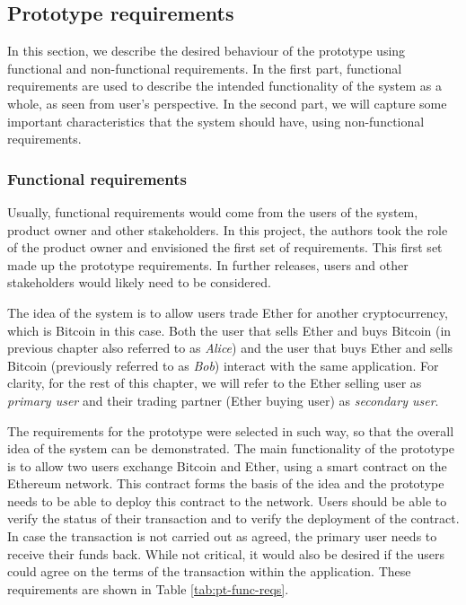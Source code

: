\subsection{Prototype requirements}

In this section, we describe the desired behaviour of the prototype using functional and non-functional requirements. In the first part, functional requirements are used to describe the intended functionality of the system as a whole, as seen from user's perspective. In the second part, we will capture some important characteristics that the system should have, using non-functional requirements.

\subsubsection{Functional requirements}
Usually, functional requirements would come from the users of the system, product owner and other stakeholders. In this project, the authors took the role of the product owner and envisioned the first set of requirements. This first set made up the prototype requirements. In further releases, users and other stakeholders would likely need to be considered.


The idea of the system is to allow users trade Ether for another cryptocurrency, which is Bitcoin in this case. Both the user that sells Ether and buys Bitcoin (in previous chapter also referred to as \textit{Alice}) and the user that buys Ether and sells Bitcoin (previously referred to as \textit{Bob}) interact with the same application. For clarity, for the rest of this chapter, we will refer to the Ether selling user as \textit{primary user} and their trading partner (Ether buying user) as \textit{secondary user}.

The requirements for the prototype were selected in such way, so that the overall idea of the system can be demonstrated. The main functionality of the prototype is to allow two users exchange Bitcoin and Ether, using a smart contract on the Ethereum network. This contract forms the basis of the idea and the prototype needs to be able to deploy this contract to the network. Users should be able to verify the status of their transaction and to verify the deployment of the contract. In case the transaction is not carried out as agreed, the primary user needs to receive their funds back. While not critical, it would also be desired if the users could agree on the terms of the transaction within the application. These requirements are shown in Table \ref{tab:pt-func-reqs}. 

